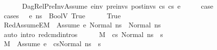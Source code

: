 \begin{isabellebody}
\ \ \isamarkupfalse%
\isanewline
{}\isamarkupfalse%
\isanewline
\ \ \isamarkupfalse%
\ {\isacharparenleft}{\kern0pt}DagRel{\isacharunderscore}{\kern0pt}PreInv{\isacharunderscore}{\kern0pt}Assume\ e{\isacharunderscore}{\kern0pt}inv\ pre{\isacharunderscore}{\kern0pt}invs\ post{\isacharunderscore}{\kern0pt}invs\ cs{}\ cs{}\ e{\isacharparenright}{\kern0pt}\isanewline
\ \ \isamarkupfalse%
\ \isamarkupfalse%
\ {\isacharquery}{\kern0pt}case\isanewline
\ \ \isamarkupfalse%
\ {\isacharparenleft}{\kern0pt}cases\ {\isachardoublequoteopen}{\isasymLambda}{\isacharcomma}{\kern0pt}{\isasymGamma}{\isacharcomma}{\kern0pt}{\isasymOmega}\ {\isasymturnstile}\ {\isasymlangle}e{\isacharcomma}{\kern0pt}\ ns{}{\isasymrangle}\ {\isasymDown}\ BoolV\ True{\isachardoublequoteclose}{\isacharparenright}{\kern0pt}\isanewline
\ \ \ \ \isamarkupfalse%
\ True\isanewline
\ \ \ \ \isamarkupfalse%
\ RedAssumeE{\isacharcolon}{\kern0pt}{\isachardoublequoteopen}M{\isacharcomma}{\kern0pt}{\isasymLambda}{\isacharcomma}{\kern0pt}{\isasymGamma}{\isacharcomma}{\kern0pt}{\isasymOmega}\ {\isasymturnstile}\ {\isasymlangle}Assume\ e{\isacharcomma}{\kern0pt}\ Normal\ ns{}{\isasymrangle}\ {\isasymrightarrow}\ Normal\ ns{}{\isachardoublequoteclose}\isanewline
\ \ \ \ \ \ \isamarkupfalse%
\ {\isacharparenleft}{\kern0pt}auto\ intro{\isacharcolon}{\kern0pt}\ red{\isacharunderscore}{\kern0pt}cmd{\isachardot}{\kern0pt}intros{\isacharparenright}{\kern0pt}\isanewline
\ \ \ \ \isamarkupfalse%
\ {\isachardoublequoteopen}M{\isacharcomma}{\kern0pt}{\isasymLambda}{\isacharcomma}{\kern0pt}{\isasymGamma}{\isacharcomma}{\kern0pt}{\isasymOmega}\ {\isasymturnstile}\ {\isasymlangle}cs{}{\isacharcomma}{\kern0pt}\ Normal\ ns{}{\isasymrangle}\ {\isacharbrackleft}{\kern0pt}{\isasymrightarrow}{\isacharbrackright}{\kern0pt}\ s{\isacharprime}{\kern0pt}{\isachardoublequoteclose}\isanewline
\ \ \ \ \ \ \isamarkupfalse%
\ {\isacartoucheopen}M{\isacharcomma}{\kern0pt}{\isasymLambda}{\isacharcomma}{\kern0pt}{\isasymGamma}{\isacharcomma}{\kern0pt}{\isasymOmega}\ {\isasymturnstile}\ {\isasymlangle}Assume\ e\ {\isacharhash}{\kern0pt}\ cs{}{\isacharcomma}{\kern0pt}Normal\ ns{}{\isasymrangle}\ {\isacharbrackleft}{\kern0pt}{\isasymrightarrow}{\isacharbrackright}{\kern0pt}\ s{\isacharprime}{\kern0pt}{\isacartoucheclose}\isanewline

\end{isabellebody}
